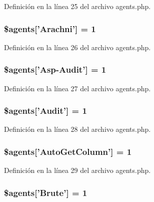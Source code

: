 Definición en la línea 25 del archivo agents.\-php.

\hypertarget{agents_8php_a95d2a72c0b69091b2720de811d435830}{
\subsubsection[{\$agents}]{\setlength{\rightskip}{0pt plus 5cm}\$agents\mbox{[}'Arachni'\mbox{]} = 1}}\label{agents_8php_a95d2a72c0b69091b2720de811d435830}


Definición en la línea 26 del archivo agents.\-php.

\hypertarget{agents_8php_ae96e0481dc7a1032823b270a66e50721}{
\subsubsection[{\$agents}]{\setlength{\rightskip}{0pt plus 5cm}\$agents\mbox{[}'Asp-\/Audit'\mbox{]} = 1}}\label{agents_8php_ae96e0481dc7a1032823b270a66e50721}


Definición en la línea 27 del archivo agents.\-php.

\hypertarget{agents_8php_a9edcf392a68dec4bf0cdc496cc3d6de9}{
\subsubsection[{\$agents}]{\setlength{\rightskip}{0pt plus 5cm}\$agents\mbox{[}'Audit'\mbox{]} = 1}}\label{agents_8php_a9edcf392a68dec4bf0cdc496cc3d6de9}


Definición en la línea 28 del archivo agents.\-php.

\hypertarget{agents_8php_ade22bffe2d979ef9c8070dcfd0595523}{
\subsubsection[{\$agents}]{\setlength{\rightskip}{0pt plus 5cm}\$agents\mbox{[}'Auto\-Get\-Column'\mbox{]} = 1}}\label{agents_8php_ade22bffe2d979ef9c8070dcfd0595523}


Definición en la línea 29 del archivo agents.\-php.

\hypertarget{agents_8php_ae2900c7672753a2b91ea0ebe928f34d8}{
\subsubsection[{\$agents}]{\setlength{\rightskip}{0pt plus 5cm}\$agents\mbox{[}'Brute'\mbox{]} = 1}}\label{agents_8php_ae2900c7672753a2b91ea0ebe928f34d8}


